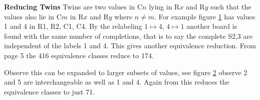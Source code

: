 \documentclass[a4paper,11pt]{report}
\newcounter{row}
\newcounter{col}
\newcounter{rowb}
\newcounter{colb}
\newcommand\setrowb[3]{
\setcounter{colb}{1}
\foreach \n in {#1, #2, #3} {
\edef\x{\value{colb} - 0.5}
\edef\y{3.5 - \value{rowb}}
\node[anchor=center] at (\x, \y) {\n};
\stepcounter{colb}
}
\stepcounter{rowb}
}
\begin{document}
\textbf{Reducing Twins}
Twins are two values in C$n$ lying in R$x$ and R$y$ such that the values also lie in C$m$ in R$x$ and R$y$ where $n\neq m$. For example figure \ref{fig:twins} has values 1 and 4 in R1, R2, C1, C4. By the relabeling $1\mapsto 4$, $4\mapsto 1$ another board is found with the same number of completions, that is to say the complete S2,3 are independent of the labels 1 and 4. This gives another equivalence reduction. From \cite{felgenhauer2005enumerating}page 5 the 416 equivalence classes reduce to 174.

\begin{figure}[h!]
\centering
{}
\caption{\label{fig:twins}}
\end{figure}

Observe this can be expanded to larger subsets of values, see figure \ref{fig:twinsagain} observe 2 and 5 are interchangeable as well as 1 and 4. Again from \cite{felgenhauer2005enumerating} this reduces the equivalence classes to just 71.

\begin{figure}[h!]
\centering
{}
\caption{\label{fig:twinsagain}}
\end{figure}
\end{document}
